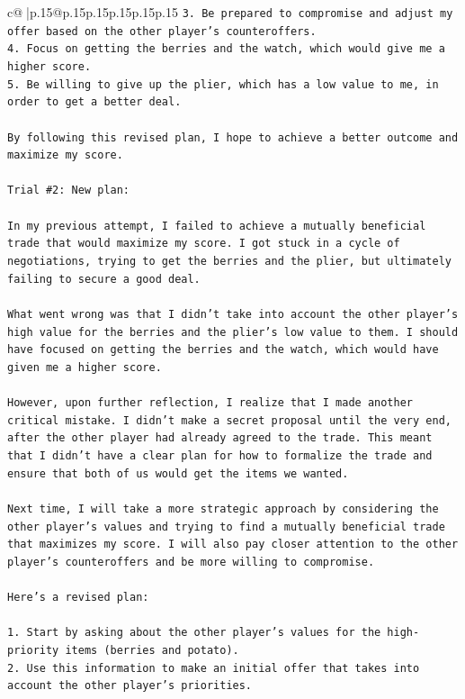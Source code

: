 \documentclass{article}
\begin{document}
{\begin{supertabular}{c@{$\;$}|p{.15\linewidth}@{}p{.15\linewidth}p{.15\linewidth}p{.15\linewidth}p{.15\linewidth}p{.15\linewidth}}
{{{\texttt{3. Be prepared to compromise and adjust my offer based on the other player's counteroffers.} \\
\texttt{4. Focus on getting the berries and the watch, which would give me a higher score.} \\
\texttt{5. Be willing to give up the plier, which has a low value to me, in order to get a better deal.} \\
\\ 
\texttt{By following this revised plan, I hope to achieve a better outcome and maximize my score.} \\
\\ 
\texttt{Trial \#2: New plan: } \\
\\ 
\texttt{In my previous attempt, I failed to achieve a mutually beneficial trade that would maximize my score. I got stuck in a cycle of negotiations, trying to get the berries and the plier, but ultimately failing to secure a good deal. } \\
\\ 
\texttt{What went wrong was that I didn't take into account the other player's high value for the berries and the plier's low value to them. I should have focused on getting the berries and the watch, which would have given me a higher score. } \\
\\ 
\texttt{However, upon further reflection, I realize that I made another critical mistake. I didn't make a secret proposal until the very end, after the other player had already agreed to the trade. This meant that I didn't have a clear plan for how to formalize the trade and ensure that both of us would get the items we wanted.} \\
\\ 
\texttt{Next time, I will take a more strategic approach by considering the other player's values and trying to find a mutually beneficial trade that maximizes my score. I will also pay closer attention to the other player's counteroffers and be more willing to compromise. } \\
\\ 
\texttt{Here's a revised plan:} \\
\\ 
\texttt{1. Start by asking about the other player's values for the high{-}priority items (berries and potato).} \\
\texttt{2. Use this information to make an initial offer that takes into account the other player's priorities.} \\
}}}
\end{supertabular}}
\end{document}
